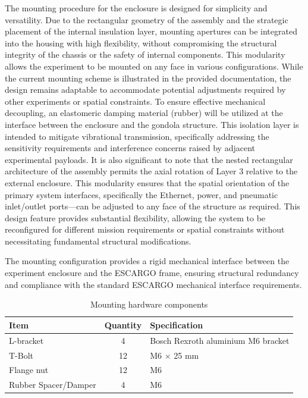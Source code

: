 The mounting procedure for the enclosure is designed for simplicity and versatility. Due to the rectangular geometry of the assembly and the strategic placement of the internal insulation layer, mounting apertures can be integrated into the housing with high flexibility, without compromising the structural integrity of the chassis or the safety of internal components.
This modularity allows the experiment to be mounted on any face in various configurations.
While the current mounting scheme is illustrated in the provided documentation, the design remains adaptable to accommodate potential adjustments required by other experiments or spatial constraints.
To ensure effective mechanical decoupling, an elastomeric damping material (rubber) will be utilized at the interface between the enclosure and the gondola structure.
This isolation layer is intended to mitigate vibrational transmission, specifically addressing the sensitivity requirements and interference concerns raised by adjacent experimental payloads. 
It is also significant to note that the nested rectangular architecture of the assembly permits the axial rotation of Layer 3 relative to the external enclosure.
This modularity ensures that the spatial orientation of the primary system interfaces, specifically the Ethernet, power, and pneumatic inlet/outlet ports—can be adjusted to any face of the structure as required.
This design feature provides substantial flexibility, allowing the system to be reconfigured for different mission requirements or spatial constraints without necessitating fundamental structural modifications.

The mounting configuration provides a rigid mechanical interface between the experiment enclosure and the ESCARGO frame, ensuring structural redundancy and compliance with the standard ESCARGO mechanical interface requirements.

\begin{table}[htbp]
\centering
\begin{tabular}{lcl}
\toprule
\textbf{Item} & \textbf{Quantity} & \textbf{Specification} \\
\midrule
L-bracket & 4 & Bosch Rexroth aluminium M6 bracket \\
T-Bolt & 12 & M6 $\times$ 25 mm \\
Flange nut & 12 & M6 \\
Rubber Spacer/Damper & 4 & M6 \\
\bottomrule
\end{tabular}
\caption{Mounting hardware components}
\label{tab:mounting_hardware}
\end{table}

